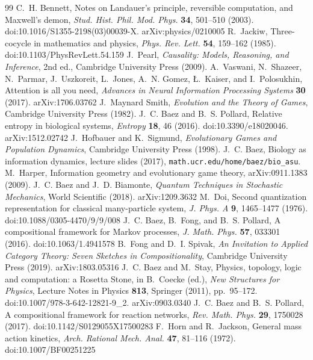 \documentclass[10pt]{article}
\begin{document}
\begin{thebibliography}{99}
 C.~H. Bennett, Notes on Landauer's principle, reversible computation, and Maxwell's demon, \textit{Stud. Hist. Phil. Mod. Phys.} \textbf{34}, 501--510 (2003). doi:10.1016/S1355-2198(03)00039-X. arXiv:physics/0210005
 R.~Jackiw, Three-cocycle in mathematics and physics, \textit{Phys. Rev. Lett.} \textbf{54}, 159--162 (1985). doi:10.1103/PhysRevLett.54.159
 J.~Pearl, \textit{Causality: Models, Reasoning, and Inference}, 2nd ed., Cambridge University Press (2009).
 A.~Vaswani, N.~Shazeer, N.~Parmar, J.~Uszkoreit, L.~Jones, A.~N. Gomez, {\L}.~Kaiser, and I.~Polosukhin, Attention is all you need, \textit{Advances in Neural Information Processing Systems} \textbf{30} (2017). arXiv:1706.03762
 J.~Maynard Smith, \textit{Evolution and the Theory of Games}, Cambridge University Press (1982).
 J.~C. Baez and B.~S. Pollard, Relative entropy in biological systems, \textit{Entropy} \textbf{18}, 46 (2016). doi:10.3390/e18020046. arXiv:1512.02742
 J.~Hofbauer and K.~Sigmund, \textit{Evolutionary Games and Population Dynamics}, Cambridge University Press (1998).
 J.~C. Baez, Biology as information dynamics, lecture slides (2017), \texttt{math.ucr.edu/home/baez/bio\_asu}.
 M.~Harper, Information geometry and evolutionary game theory, arXiv:0911.1383 (2009).
 J.~C. Baez and J.~D. Biamonte, \textit{Quantum Techniques in Stochastic Mechanics}, World Scientific (2018). arXiv:1209.3632
 M.~Doi, Second quantization representation for classical many-particle system, \textit{J. Phys. A} \textbf{9}, 1465--1477 (1976). doi:10.1088/0305-4470/9/9/008
 J.~C. Baez, B.~Fong, and B.~S. Pollard, A compositional framework for Markov processes, \textit{J. Math. Phys.} \textbf{57}, 033301 (2016). doi:10.1063/1.4941578
 B.~Fong and D.~I. Spivak, \textit{An Invitation to Applied Category Theory: Seven Sketches in Compositionality}, Cambridge University Press (2019). arXiv:1803.05316
 J.~C. Baez and M.~Stay, Physics, topology, logic and computation: a Rosetta Stone, in B.~Coecke (ed.), \textit{New Structures for Physics}, Lecture Notes in Physics \textbf{813}, Springer (2011), pp.~95--172. doi:10.1007/978-3-642-12821-9\_2. arXiv:0903.0340
 J.~C. Baez and B.~S. Pollard, A compositional framework for reaction networks, \textit{Rev. Math. Phys.} \textbf{29}, 1750028 (2017). doi:10.1142/S0129055X17500283
 F.~Horn and R.~Jackson, General mass action kinetics, \textit{Arch. Rational Mech. Anal.} \textbf{47}, 81--116 (1972). doi:10.1007/BF00251225

\end{thebibliography}
\end{document}
